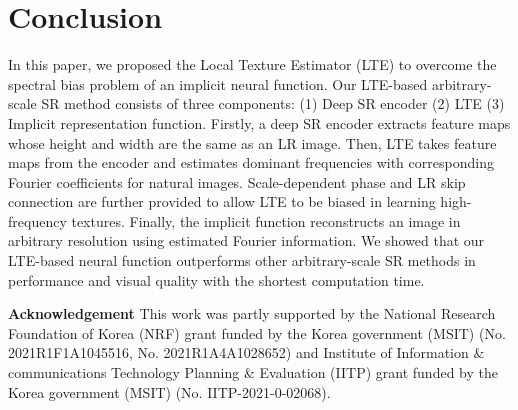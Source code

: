 \documentclass[10pt,twocolumn,letterpaper]{article}
\begin{document}
\section{Conclusion}
In this paper, we proposed the Local Texture Estimator (LTE) to overcome the spectral bias problem of an implicit neural function. Our LTE-based arbitrary-scale SR method consists of three components: (1) Deep SR encoder (2) LTE (3) Implicit representation function. Firstly, a deep SR encoder extracts feature maps whose height and width are the same as an LR image. Then, LTE takes feature maps from the encoder and estimates dominant frequencies with corresponding Fourier coefficients for natural images. Scale-dependent phase and LR skip connection are further provided to allow LTE to be biased in learning high-frequency textures. Finally, the implicit function reconstructs an image in arbitrary resolution using estimated Fourier information. We showed that our LTE-based neural function outperforms other arbitrary-scale SR methods in performance and visual quality with the shortest computation time.


\vspace{8pt}
\noindent
\small{\textbf{Acknowledgement} This work was partly supported by the National Research Foundation of Korea (NRF) grant funded by the Korea government (MSIT) (No. 2021R1F1A1045516, No. 2021R1A4A1028652) and Institute of Information \& communications Technology Planning \& Evaluation (IITP) grant funded by the Korea government (MSIT) (No. IITP-2021-0-02068).}
\end{document}
